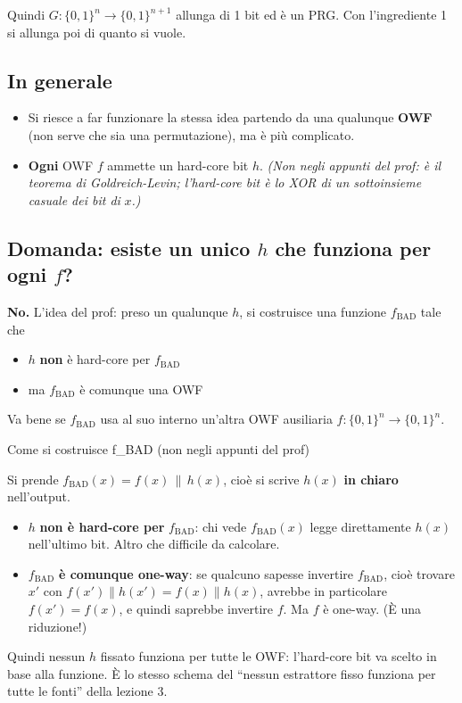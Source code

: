 Quindi \(G : \{0,1\}^n \to \{0,1\}^{n+1}\) allunga di 1 bit ed è un PRG. Con l'ingrediente 1 si allunga poi di quanto si vuole.

\subsection{In generale}

\begin{itemize}
\tightlist
\item
  Si riesce a far funzionare la stessa idea partendo da una qualunque \textbf{OWF} (non serve che sia una permutazione), ma è più complicato.
\item
  \textbf{Ogni} OWF \(f\) ammette un hard-core bit \(h\). \emph{(Non negli appunti del prof: è il teorema di Goldreich-Levin; l'hard-core bit è lo XOR di un sottoinsieme casuale dei bit di} \(x\)\emph{.)}
\end{itemize}

\subsection{\texorpdfstring{Domanda: esiste un unico \(h\) che funziona per ogni \(f\)?}{Domanda: esiste un unico h che funziona per ogni f?}}

\textbf{No.} L'idea del prof: preso un qualunque \(h\), si costruisce una funzione \(f_{\text{BAD}}\) tale che

\begin{itemize}
\tightlist
\item
  \(h\) \textbf{non} è hard-core per \(f_{\text{BAD}}\)
\item
  ma \(f_{\text{BAD}}\) è comunque una OWF
\end{itemize}

Va bene se \(f_{\text{BAD}}\) usa al suo interno un'altra OWF ausiliaria \(f : \{0,1\}^n \to \{0,1\}^n\).

\begin{approfondimento}{Come si costruisce f\_BAD (non negli appunti del prof)}

Si prende \(f_{\text{BAD}}(x) = f(x) \,\|\, h(x)\), cioè si scrive \(h(x)\) \textbf{in chiaro} nell'output.

\begin{itemize}
\tightlist
\item
  \(h\) \textbf{non è hard-core per} \(f_{\text{BAD}}\): chi vede \(f_{\text{BAD}}(x)\) legge direttamente \(h(x)\) nell'ultimo bit. Altro che difficile da calcolare.
\item
  \(f_{\text{BAD}}\) \textbf{è comunque one-way}: se qualcuno sapesse invertire \(f_{\text{BAD}}\), cioè trovare \(x'\) con \(f(x') \| h(x') = f(x) \| h(x)\), avrebbe in particolare \(f(x') = f(x)\), e quindi saprebbe invertire \(f\). Ma \(f\) è one-way. (È una riduzione!)
\end{itemize}

Quindi nessun \(h\) fissato funziona per tutte le OWF: l'hard-core bit va scelto in base alla funzione. È lo stesso schema del ``nessun estrattore fisso funziona per tutte le fonti'' della lezione 3.

\end{approfondimento}

